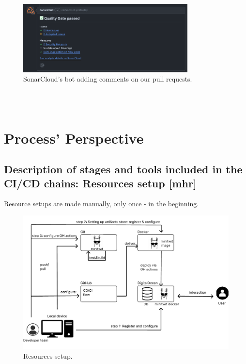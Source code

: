 \documentclass{article}
\begin{document}
\begin{figure}[ht]
    \centering
    \includegraphics[width=0.8\textwidth]{./images/SonarCloud_bot.png}
    \caption{SonarCloud's bot adding comments on our pull requests.}
    \label{fig:notion-dashboard}
\end{figure}
\\\\

\section{Process' Perspective}

\subsection{Description of stages and tools included in the CI/CD chains: Resources setup [mhr]}

Resource setups  are made manually, only once - in the beginning.

\begin{figure}[ht]
    \centering
    \includegraphics[width=1.0\textwidth]{./pdfs/resourse_setup.pdf} 
    \caption{Resources setup.}
    \label{fig:Resourse setup}
\end{figure}
\end{document}
